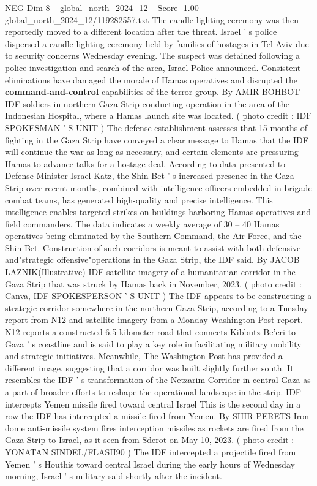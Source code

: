 \begin{textsample}{NEG Dim 8 – global\_north\_2024\_12 – Score -1.00 – global\_north\_2024\_12/119282557.txt}  \label{ex:f8_neg_348}
The candle-lighting ceremony was then reportedly moved to a different location after the threat.
Israel ' s police dispersed a candle-lighting ceremony held by families of hostages in Tel Aviv due to security concerns Wednesday evening.
The suspect was detained following a police investigation and search of the area, Israel Police announced.
Consistent eliminations have damaged the morale of Hamas operatives and disrupted the \textbf{command-and-control} capabilities of the terror group.
By AMIR BOHBOT IDF soldiers in northern Gaza Strip conducting operation in the area of the Indonesian Hospital, where a Hamas launch site was located. ( photo credit : IDF SPOKESMAN ' S UNIT ) The defense establishment assesses that 15 months of fighting in the Gaza Strip have conveyed a clear message to Hamas that the IDF will continue the war as long as necessary, and certain elements are pressuring Hamas to advance talks for a hostage deal.
According to data presented to Defense Minister Israel Katz, the Shin Bet ' s increased presence in the Gaza Strip over recent months, combined with intelligence officers embedded in brigade combat teams, has generated high-quality and precise intelligence.
This intelligence enables targeted strikes on buildings harboring Hamas operatives and field commanders.
The data indicates a weekly average of 30 -- 40 Hamas operatives being eliminated by the Southern Command, the Air Force, and the Shin Bet.
Construction of such corridors is meant to assist with both defensive and"strategic offensive"operations in the Gaza Strip, the IDF said.
By JACOB LAZNIK(Illustrative) IDF satellite imagery of a humanitarian corridor in the Gaza Strip that was struck by Hamas back in November, 2023. ( photo credit : Canva, IDF SPOKESPERSON ' S UNIT ) The IDF appears to be constructing a strategic corridor somewhere in the northern Gaza Strip, according to a Tuesday report from N12 and satellite imagery from a Monday Washington Post report.
N12 reports a constructed 6.5-kilometer road that connects Kibbutz Be'eri to Gaza ' s coastline and is said to play a key role in facilitating military mobility and strategic initiatives.
Meanwhile, The Washington Post has provided a different image, suggesting that a corridor was built slightly further south.
It resembles the IDF ' s transformation of the Netzarim Corridor in central Gaza as a part of broader efforts to reshape the operational landscape in the strip.
IDF intercepts Yemen missile fired toward central Israel This is the second day in a row the IDF has intercepted a missile fired from Yemen.
By SHIR PERETS Iron dome anti-missile system fires interception missiles as rockets are fired from the Gaza Strip to Israel, as it seen from Sderot on May 10, 2023. ( photo credit : YONATAN SINDEL/FLASH90 ) The IDF intercepted a projectile fired from Yemen ' s Houthis toward central Israel during the early hours of Wednesday morning, Israel ' s military said shortly after the incident.

\end{textsample}
